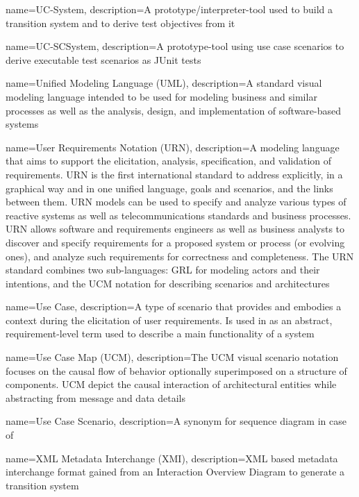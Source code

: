 {
	name={UC-System},
	description={A prototype/interpreter-tool used to build a transition system and to derive test objectives from it \cite{ClementineNebut2006}}
}

{
	name={UC-SCSystem},
	description={A prototype-tool using use case scenarios to derive executable test scenarios as JUnit tests \cite{ClementineNebut2006}}
}

{
	name={Unified Modeling Language (UML)},
	description={A standard visual modeling language intended to be used for modeling business and similar processes as well as the analysis, design, and implementation of software-based systems \cite{UML}}
}

{
	name={User Requirements Notation (URN)},
	description={A modeling language that aims to support the elicitation, analysis, specification, and validation of requirements. URN is the first international standard to address explicitly, in a graphical way and in one unified language, goals and scenarios, and the links between them. URN models can be used to specify and analyze various types of reactive systems as well as telecommunications standards and business processes. URN allows software and requirements engineers as well as business analysts to discover and specify requirements for a proposed system or process (or evolving ones), and analyze such requirements for correctness and completeness. The URN standard combines two sub-languages: GRL for modeling actors and their intentions, and the UCM notation for describing scenarios and architectures \cite{Amyot2011}}
}

{
	name={Use Case},
	description={A type of scenario that provides and embodies a context during the elicitation of user requirements. Is used in \cite{ClementineNebut2006} as an abstract, requirement-level term used to describe a main functionality of a system \cite{SWEBOK, ClementineNebut2006}}
}

{
	name={Use Case Map (UCM)},
	description={The UCM visual scenario notation focuses on the causal flow of behavior optionally superimposed on a structure of components. UCM depict the causal interaction of architectural entities while abstracting from message and data details \cite{Amyot2011}}
}

{
	name={Use Case Scenario},
	description={A synonym for sequence diagram in case of \cite{ClementineNebut2006}}
}

{
	name={XML Metadata Interchange (XMI)},
	description={XML based metadata interchange format gained from an Interaction Overview Diagram to generate a transition system \cite{NajlaRaza2007}}
}

